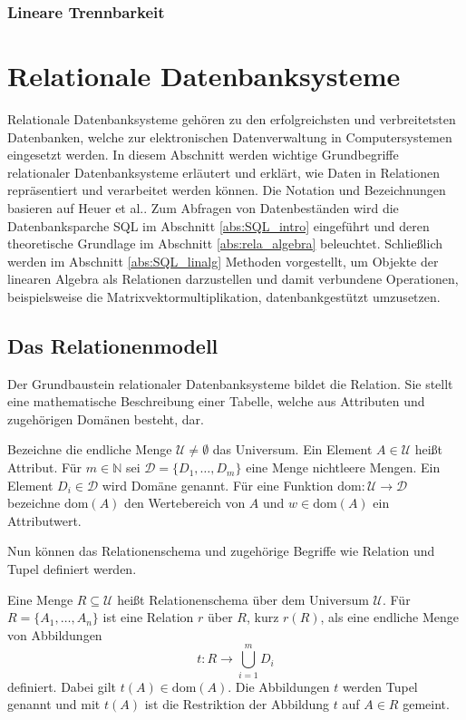 \subsubsection*{Lineare Trennbarkeit}
\section{Relationale Datenbanksysteme}
\label{abs:relation_intro}
Relationale Datenbanksysteme gehören zu den erfolgreichsten und verbreitetsten Datenbanken, welche zur elektronischen Datenverwaltung in Computersystemen eingesetzt werden. In diesem Abschnitt werden wichtige Grundbegriffe relationaler Datenbanksysteme erläutert und erklärt, wie Daten in Relationen repräsentiert und verarbeitet werden können. Die Notation und Bezeichnungen basieren auf Heuer et al.\cite{DBLP:books/daglib/0044627}. Zum Abfragen von Datenbeständen wird die Datenbanksparche SQL im Abschnitt \ref{abs:SQL_intro} eingeführt und deren theoretische Grundlage im Abschnitt \ref{abs:rela_algebra} beleuchtet. Schließlich werden im Abschnitt \ref{abs:SQL_linalg} Methoden vorgestellt, um Objekte der linearen Algebra als Relationen darzustellen und damit verbundene Operationen, beispielsweise die Matrixvektormultiplikation, datenbankgestützt umzusetzen.

\subsection{Das Relationenmodell}
Der Grundbaustein relationaler Datenbanksysteme bildet die Relation. Sie stellt eine mathematische Beschreibung einer Tabelle, welche aus Attributen und zugehörigen Domänen besteht, dar.

\begin{defi}
    \label{def:universum}
    Bezeichne die endliche Menge $\mathcal{U} \neq \emptyset$ das Universum. Ein Element $A \in \mathcal{U}$ heißt Attribut. Für $m \in \mathbb{N}$ sei $\mathcal{D}=\{D_1, \ldots, D_m\}$ eine Menge nichtleere Mengen. Ein Element $D_i \in \mathcal{D}$ wird Domäne genannt. Für eine Funktion $\mathrm{dom}: \mathcal{U} \rightarrow \mathcal{D}$ bezeichne $\mathrm{dom}(A)$ den Wertebereich von $A$ und $w \in \mathrm{dom}(A)$ ein Attributwert.
\end{defi}

Nun können das Relationenschema und zugehörige Begriffe wie Relation und Tupel definiert werden.

\begin{defi}
    \label{def:relation}
    Eine Menge $R \subseteq \mathcal{U}$ heißt Relationenschema über dem Universum $\mathcal{U}$. Für $R=\{A_1, \ldots, A_n \}$ ist eine Relation $r$ über $R$, kurz $r(R)$, als eine endliche Menge von Abbildungen
    \begin{equation*}
        t:R \rightarrow \bigcup_{i=1}^m D_i
    \end{equation*}
    definiert. Dabei gilt $t(A) \in \mathrm{dom}(A)$. Die Abbildungen $t$ werden Tupel genannt und mit $t(A)$ ist die Restriktion der Abbildung $t$ auf $A \in R$ gemeint.
\end{defi}

